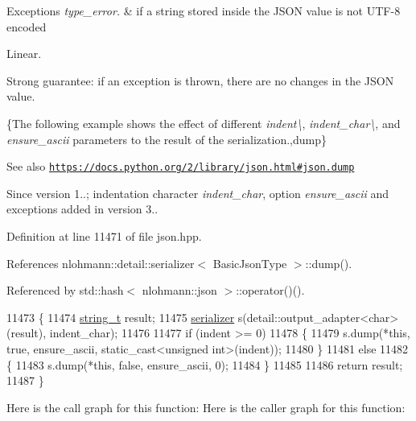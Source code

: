 \begin{DoxyExceptions}{Exceptions}
{\em type\+\_\+error.} & if a string stored inside the J\+S\+ON value is not U\+T\+F-\/8 encoded\\
\hline
\end{DoxyExceptions}
Linear.

Strong guarantee\+: if an exception is thrown, there are no changes in the J\+S\+ON value.

\{The following example shows the effect of different {\itshape indent\textbackslash{}}, {\itshape indent\+\_\+char\textbackslash{}}, and {\itshape ensure\+\_\+ascii} parameters to the result of the serialization.,dump\}

\begin{DoxySeeAlso}{See also}
\href{https://docs.python.org/2/library/json.html#json.dump}{\tt https\+://docs.\+python.\+org/2/library/json.\+html\#json.\+dump}
\end{DoxySeeAlso}
\begin{DoxySince}{Since}
version 1..; indentation character {\itshape indent\+\_\+char}, option {\itshape ensure\+\_\+ascii} and exceptions added in version 3.. 
\end{DoxySince}


Definition at line 11471 of file json.\+hpp.



References nlohmann\+::detail\+::serializer$<$ Basic\+Json\+Type $>$\+::dump().



Referenced by std\+::hash$<$ nlohmann\+::json $>$\+::operator()().


\begin{DoxyCode}
11473     \{
11474         \hyperlink{classnlohmann_1_1basic__json_a61f8566a1a85a424c7266fb531dca005}{string\_t} result;
11475         \hyperlink{classnlohmann_1_1basic__json_a68557c31b3bdf31c12e148baecec0d23}{serializer} s(detail::output\_adapter<char>(result), indent\_char);
11476 
11477         \textcolor{keywordflow}{if} (indent >= 0)
11478         \{
11479             s.dump(*\textcolor{keyword}{this}, \textcolor{keyword}{true}, ensure\_ascii, static\_cast<unsigned int>(indent));
11480         \}
11481         \textcolor{keywordflow}{else}
11482         \{
11483             s.dump(*\textcolor{keyword}{this}, \textcolor{keyword}{false}, ensure\_ascii, 0);
11484         \}
11485 
11486         \textcolor{keywordflow}{return} result;
11487     \}
\end{DoxyCode}
Here is the call graph for this function\+:
Here is the caller graph for this function\+:
\mbox{\label{classnlohmann_1_1basic__json_a5338e282d1d02bed389d852dd670d98d}} 
